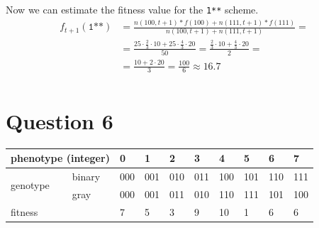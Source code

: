 \documentclass[12pt, a4paper]{article}
\begin{document}
        Now we can estimate the fitness value for the \texttt{1**} scheme.
        \begin{align*}
            f_{t+1}(\texttt{1**}) &= \frac{n(100, t+1) * f(100) + n(111, t+1) * f(111)}{n(100, t+1) + n(111, t+1)} =\\
            &= \frac{25 \cdot \frac{2}{3} \cdot 10 + 25 \cdot \frac{4}{3} \cdot 20}{50}
            = \frac{\frac{2}{3} \cdot 10 + \frac{4}{3} \cdot 20}{2} =\\
            &= \frac{10 + 2 \cdot 20}{3} = \frac{100}{6} \approx 16.7\\
        \end{align*}

    \section{Question 6}
        \begin{table}[H]
        \centering
            \begin{tabular}{|l|l|llllllll|}
            \hline
            \multicolumn{2}{l|}{phenotype (integer)} & 0   & 1   & 2   & 3   & 4   & 5   & 6   & 7   \\ \hline
            \multirow{2}{*}{genotype}    & binary    & 000 & 001 & 010 & 011 & 100 & 101 & 110 & 111 \\
                                         & gray      & 000 & 001 & 011 & 010 & 110 & 111 & 101 & 100 \\ \hline
            \multicolumn{2}{|l|}{fitness}             & 7   & 5   & 3   & 9   & 10  & 1   & 6   & 6   \\ \hline
            \end{tabular}
        \end{table}
\end{document}
